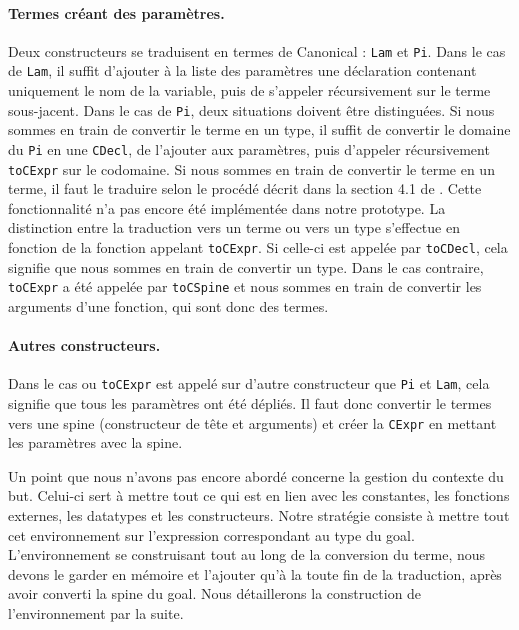 \documentclass[11pt]{article}
\begin{document}
\paragraph{Termes créant des paramètres.}
Deux constructeurs se traduisent en termes de Canonical : \texttt{Lam} et \texttt{Pi}.
Dans le cas de \texttt{Lam}, il suffit d'ajouter à la liste des paramètres une déclaration contenant uniquement le nom de la variable, puis de s'appeler récursivement sur le terme sous-jacent.
Dans le cas de \texttt{Pi}, deux situations doivent être distinguées.
Si nous sommes en train de convertir le terme en un type, il suffit de convertir le domaine du \texttt{Pi} en une \texttt{CDecl}, de l'ajouter aux paramètres, puis d'appeler récursivement \texttt{toCExpr} sur le codomaine.
Si nous sommes en train de convertir le terme en un terme, il faut le traduire selon le procédé décrit dans la section 4.1 de \cite{norman2025canonical}. Cette fonctionnalité n'a pas encore été implémentée dans notre prototype.
La distinction entre la traduction vers un terme ou vers un type s'effectue en fonction de la fonction appelant \texttt{toCExpr}.
Si celle-ci est appelée par \texttt{toCDecl}, cela signifie que nous sommes en train de convertir un type.
Dans le cas contraire, \texttt{toCExpr} a été appelée par \texttt{toCSpine} et nous sommes en train de convertir les arguments d'une fonction, qui sont donc des termes.

\paragraph{Autres constructeurs.}
Dans le cas ou \texttt{toCExpr} est appelé sur d'autre constructeur que \texttt{Pi} et \texttt{Lam}, cela signifie que tous les paramètres ont été dépliés.
Il faut donc convertir le termes vers une spine (constructeur de tête et arguments) et créer la \texttt{CExpr} en mettant les paramètres avec la spine.

Un point que nous n'avons pas encore abordé concerne la gestion du contexte du but.
Celui-ci sert à mettre tout ce qui est en lien avec les constantes, les fonctions externes, les datatypes et les constructeurs.
Notre stratégie consiste à mettre tout cet environnement sur l'expression correspondant au type du goal. 
L'environnement se construisant tout au long de la conversion du terme, nous devons le garder en mémoire et l'ajouter qu'à la toute fin de la traduction,
après avoir converti la spine du goal.
Nous détaillerons la construction de l'environnement par la suite.
\end{document}
